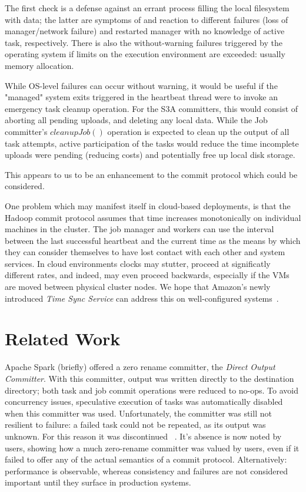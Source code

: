 \documentclass[conference]{IEEEtran}
\begin{document}
The first check is a defense against an errant process filling the local
filesystem with data;
the latter are symptoms of and reaction to different failures (loss of manager/network failure)
and restarted manager with no knowledge of active task, respectively.
There is also the without-warning failures triggered by the operating system
if limits on the execution environment are exceeded: usually memory allocation.

While OS-level failures can occur without warning, it would be useful if the
"managed" system exits triggered in the heartbeat thread were to invoke
an emergency task cleanup operation.
For the S3A committers, this would consist of aborting all pending uploads, and
deleting any local data.
While the Job committer's $cleanupJob()$ operation is expected to clean up
the output of all task attempts, active participation of the tasks would
reduce the time incomplete uploads were pending (reducing costs) and
potentially free up local disk storage.

This appears to us to be an enhancement to the commit protocol which could
be considered.


One problem which may manifest itself in cloud-based deployments,
is that the Hadoop commit protocol assumes that time increases monotonically
on individual machines in the cluster.
The job manager and workers can use the interval between the last successful heartbeat
and the current time as the means by which they can consider themselves to have lost
contact with each other and system services.
In cloud environments clocks may stutter, proceed at significatly different rates,
and indeed, may even proceed backwards, especially if the VMs are moved between
physical cluster nodes.
We hope that Amazon's newly introduced \emph{Time Sync Service}
can address this on well-configured systems\ \cite{AWS-clock-service}.



\section{Related Work}
\label{sec:relatedWork}

Apache Spark (briefly) offered a zero rename committer,
the \emph{Direct Output Committer}.
With this committer, output was written directly to the destination directory;
both task and job commit operations were reduced to no-ops.
To avoid concurrency issues, speculative execution of tasks was automatically
disabled when this committer was used.
Unfortunately, the committer was still not resilient to failure: a failed
task could not be repeated, as its output was unknown.
For this reason it was discontinued \ \cite{SPARK-10063}.
It's absence is now noted by users, showing how a much zero-rename committer
was valued by users, even if it failed to offer any of the actual semantics
of a commit protocol.
Alternatively: performance is observable, whereas consistency and failures
are not considered important until they surface in production systems.
\end{document}

